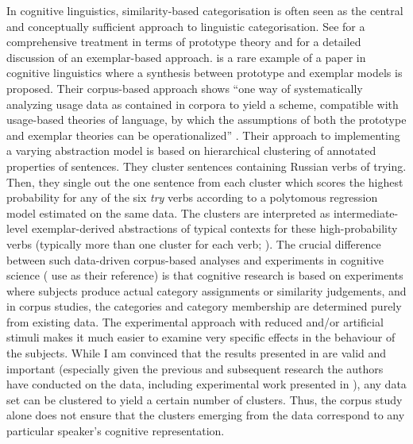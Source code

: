 In cognitive linguistics, similarity-based categorisation is often seen as the central and conceptually sufficient approach to linguistic categorisation.
See \cite{Taylor2003} for a comprehensive treatment in terms of prototype theory and \cite{Taylor2012} for a detailed discussion of an exemplar-based approach.
\cite{DivjakArppe2013} is a rare example of a paper in cognitive linguistics where a synthesis between prototype and exemplar models is proposed.
Their corpus-based approach shows ``one way of systematically analyzing usage data as contained in corpora to yield a scheme, compatible with usage-based theories of language, by which the assumptions of both the prototype and exemplar theories can be operationalized'' \citep[267]{DivjakArppe2013}.
Their approach to implementing a varying abstraction model \citep[254--260]{DivjakArppe2013} is based on hierarchical clustering of annotated properties of sentences.
They cluster sentences containing Russian verbs of trying.
Then, they single out the one sentence from each cluster which scores the highest probability for any of the six \textit{try} verbs according to a polytomous regression model estimated on the same data.
The clusters are interpreted as intermediate-level exemplar-derived abstractions of typical contexts for these high-probability verbs (typically more than one cluster for each verb; \citealp[255--256]{DivjakArppe2013}).
The crucial difference between such data-driven corpus-based analyses and experiments in cognitive science (\citealp{DivjakArppe2013} use \citealp{VerbeemenEa2007} as their reference) is that cognitive research is based on experiments where subjects produce actual category assignments or similarity judgements, and in corpus studies, the categories and category membership are determined purely from existing data.
The experimental approach with reduced and\slash or artificial stimuli makes it much easier to examine very specific effects in the behaviour of the subjects.
While I am convinced that the results presented in \citet{DivjakArppe2013} are valid and important (especially given the previous and subsequent research the authors have conducted on the data, including experimental work presented in \citealp{DivjakGries2008,DivjakEa2016}), any data set can be clustered to yield a certain number of clusters.
Thus, the corpus study alone does not ensure that the clusters emerging from the data correspond to any particular speaker's cognitive representation.


